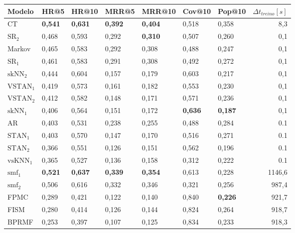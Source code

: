 \begin{table}[htbp]
  \centering
  \begin{tabular}{|l|l|l|l|l|l|l|r|}
    \hline
    Modelo & HR@5 & HR@10 & MRR@5 & MRR@10 & Cov@10 & Pop@10 & $\Delta t_{treino} [s]$ \\
    \hline
    CT & \textbf{0,541} & \textbf{0,631} & \textbf{0,392} & \textbf{0,404} & 0,518 & 0,358 & 8,3 \\
    \hline        
    $\text{SR}_{2}$ & 0,468 & 0,593 & 0,292 & \textbf{0,310} & 0,507 & 0,260 & 0,1 \\
    \hline
    Markov  & 0,465 & 0,583 & 0,292 & 0,308 & 0,488 & 0,247 & 0,1 \\
    \hline
    $\text{SR}_{1}$ & 0,461 & 0,583 & 0,291 & 0,308 & 0,492 & 0,272 & 0,1 \\
    \hline
    $\text{skNN}_{2}$ & 0,444 & 0,604 & 0,157 & 0,179 & 0,603 & 0,217 & 0,1 \\
    \hline
    $\text{VSTAN}_{1}$ & 0,419 & 0,573 & 0,161 & 0,182 & 0,553 & 0,230 & 0,1 \\
    \hline
    $\text{VSTAN}_{2}$ & 0,412 & 0,582 & 0,148 & 0,171 & 0,571 & 0,236 & 0,1 \\
    \hline
    $\text{skNN}_{1}$ & 0,406 & 0,564 & 0,151 & 0,172 & \textbf{0,636} & \textbf{0,187} & 0,1 \\
    \hline
    AR & 0,403 & 0,531 & 0,238 & 0,255 & 0,488 & 0,284 & 0.1 \\
    \hline
    $\text{STAN}_{1}$ & 0,403 & 0,570 & 0,147 & 0,170 & 0,516 & 0,271 & 0.1 \\
    \hline
    $\text{STAN}_{2}$ & 0,366 & 0,551 & 0,126 & 0,151 & 0,562 & 0,196 & 0.1 \\
    \hline
$\text{vsKNN}_{1}$ & 0,365 & 0,527 & 0,136 & 0,158 & 0,312 & 0,222 & 0.1 \\
\hline
\hline
    $\text{smf}_1$ & \textbf{0,521} & \textbf{0,637} & \textbf{0,339} & \textbf{0,354} & 0,613 & 0,228 & 1146,6 \\
    \hline
    $\text{smf}_2$ & 0,506 & 0,616 & 0,332 & 0,346 & 0,321 & 0,256 & 987,4 \\
    \hline
    FPMC & 0,289 & 0,421 & 0,122 & 0,140 & 0,840 & \textbf{0,226} & 921,7 \\
    \hline
    FISM & 0,280 & 0,414 & 0,126 & 0,144 & 0,824 & 0,264 & 918,7 \\
    \hline
    BPRMF & 0,253 & 0,397 & 0,107 & 0,125 & 0,834 & 0,233 & 918,3 \\

\end{tabular}
\end{table}
